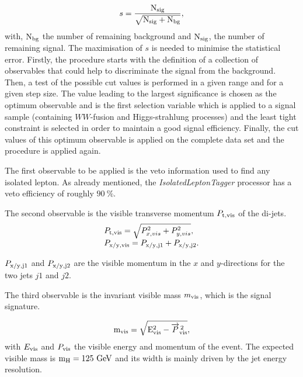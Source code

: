   \begin{equation}
    s = \frac{\rm{N_{sig}}}{\sqrt{\rm{N_{sig}}+ \rm{N_{bg}}}},
  \end{equation}
  with, $\rm{N_{bg}}$ the number of remaining background and $\rm{N_{sig}}$, the number of remaining signal.
  The maximisation of $s$ is needed to minimise the statistical error.
  Firstly, the procedure starts with the definition of a collection of observables that could help to discriminate the signal from the background.
  Then, a test of the possible cut values is performed in a given range and for a given step size.
  The value leading to the largest significance is chosen as the optimum observable and is the first selection variable which is applied to a signal sample (containing $WW$-fusion and Higgs-strahlung processes) and the least tight constraint is selected in order to maintain a good signal efficiency.
  Finally, the cut values of this optimum observable is applied on the complete data set and the procedure is applied again.

  The first observable to be applied is the veto information used to find any isolated lepton.
  As already mentioned, the \textit{IsolatedLeptonTagger} processor has a veto efficiency of roughly $90~\%$. 

  The second observable is the visible transverse momentum $P_{\rm{t,vis}}$ of the di-jets. 
  \begin{equation}
    \begin{array}{lcl}
      P_{\rm{t,vis}} = \sqrt{P^2_{x,vis} + P^2_{y,vis}}, \\
      P_{\rm{x/y,vis}} = P_{\rm{x/y,j1}} + P_{\rm{x/y,j2}}. 
    \end{array}
  \end{equation}
 
  $ P_{\rm{x/y,j1}}$ and $ P_{\rm{x/y,j2}}$ are the visible momentum in the $x$ and $y$-directions for the two jets $j1$ and $j2$.

  The third observable is the invariant visible mass $m_{\rm{vis}}$, which is the signal signature.

  \begin{equation}
   \rm{m_{vis}} = \sqrt{E^2_{\rm{vis}} - \overrightarrow{P}^{\,2}_{\rm{vis}}},
  \end{equation}
  with $E_{\rm{vis}}$ and $P_{\rm{vis}}$ the visible energy and momentum of the event.
  The expected visible mass is $\rm{m_H} = 125~\rm{GeV}$ and its width is mainly driven by the jet energy resolution.

